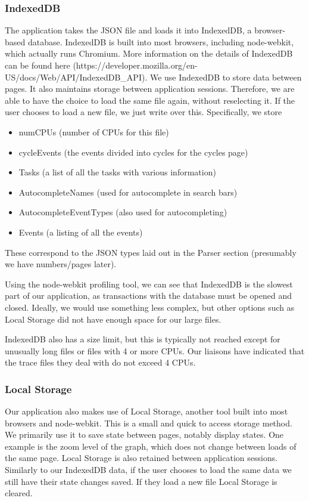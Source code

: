 \documentclass{hmcclinic}
\begin{document}
  \subsubsection{IndexedDB}

  The application takes the JSON file and loads it into IndexedDB, a
  browser-based database. IndexedDB is built into most browsers, including
  node-webkit, which actually runs Chromium. More information on the details of IndexedDB can be found here
  (https://developer.mozilla.org/en-US/docs/Web/API/IndexedDB\_API).
  We use IndexedDB to store data between pages. It also
  maintains storage between application sessions. Therefore, we are able to have
  the choice to load the same file again, without reselecting it. If the user
  chooses to load a new file, we just write over this.
  Specifically, we store 
  \begin{itemize}
    \item numCPUs (number of CPUs for this file)
    \item cycleEvents (the events divided into cycles for the cycles page)
    \item Tasks (a list of all the tasks with various information)
    \item AutocompleteNames (used for autocomplete in search bars)
    \item AutocompleteEventTypes (also used for autocompleting)
    \item Events (a listing of all the events)
  \end{itemize}
  These correspond to the JSON types laid
  out in the Parser section (presumably we have numbers/pages later).

  Using the node-webkit profiling tool, we can see that IndexedDB is the slowest
  part of our application, as transactions with the database must be opened and
  closed. Ideally, we would use something less complex, but other options such
  as Local Storage did not have enough space for our large files.

  IndexedDB also has  a size limit, but this is typically not reached except for
  unusually long files or files with 4 or more CPUs. Our liaisons have indicated
  that the trace files they deal with do not exceed 4 CPUs.

  \subsubsection{Local Storage}

  Our application also makes use of Local Storage, another tool
  built into most browsers and node-webkit. This is a small and quick to access
  storage method. We primarily use it to save state between pages, notably
  display states. One example is the zoom level of the graph, which does not
  change between loads of the same page. Local Storage is also retained between
  application sessions. Similarly to our IndexedDB data, if the user chooses to
  load the same data we still have their state changes saved. If they load a new
  file Local Storage is cleared.
\end{document}
